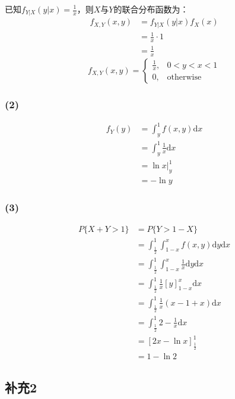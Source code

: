 \documentclass[a4paper,12pt]{ctexart}
\begin{document}
已知$f_{Y|X}(y|x) = \frac{1}{x}$，则$X$与$Y$的联合分布函数为：
\begin{align*}
	f_{X,Y}(x,y) &= f_{Y|X}(y|x) f_X(x) \\
	&= \frac{1}{x} \cdot 1 \\
	&= \frac{1}{x}
\end{align*}
\begin{equation*}
	f_{X,Y}(x,y) =
	\begin{cases}
		\frac{1}{x}, & 0 < y < x < 1 \\
		0, & \text{otherwise}
	\end{cases}
\end{equation*}

\subsubsection*{(2)}

\begin{align*}
	f_Y(y) &= \int_y^1 f(x,y) \mathrm{d}x \\
	&= \int_y^1 \frac{1}{x} \mathrm{d}x \\
	&= \ln x \bigg|_y^1 \\
	&= -\ln y
\end{align*}

\subsubsection*{(3)}

\begin{align*}
	P\{X + Y > 1\} &= P\{Y > 1 - X\} \\
	&= \int_{\frac{1}{2}}^1 \int_{1-x}^x f(x,y) \mathrm{d}y \mathrm{d}x \\
	&= \int_{\frac{1}{2}}^1 \int_{1-x}^x \frac{1}{x} \mathrm{d}y \mathrm{d}x \\
	&= \int_{\frac{1}{2}}^1 \frac{1}{x} \left[y\right]_{1-x}^x \mathrm{d}x \\
	&= \int_{\frac{1}{2}}^1 \frac{1}{x} (x - 1 + x) \mathrm{d}x \\
	&= \int_{\frac{1}{2}}^1 2 - \frac{1}{x} \mathrm{d}x \\
	&= \left[2x - \ln x\right]_{\frac{1}{2}}^1 \\
	&= 1 - \ln 2
\end{align*}

\subsection*{补充2}
\end{document}
